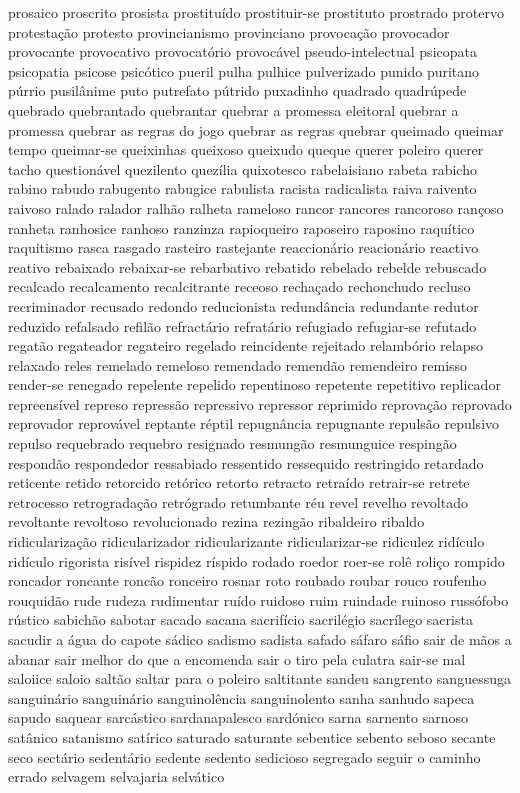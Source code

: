 \documentclass[ruledheader]{abnt_UFF}
\begin{document}
prosaico proscrito prosista prostitu\'{i}do prostituir-se prostituto prostrado protervo protesta\c{c}\~ao protesto provincianismo provinciano provoca\c{c}\~ao provocador provocante provocativo provocat\'{o}rio provoc\'{a}vel pseudo-intelectual psicopata psicopatia psicose psic\'{o}tico pueril pulha pulhice pulverizado punido puritano p\'{u}rrio pusil\^{a}nime puto putrefato p\'{u}trido puxadinho quadrado quadr\'{u}pede quebrado quebrantado quebrantar quebrar a promessa eleitoral quebrar a promessa quebrar as regras do jogo quebrar as regras quebrar queimado queimar tempo queimar-se queixinhas queixoso queixudo queque querer poleiro querer tacho question\'{a}vel quezilento quez\'{i}lia quixotesco rabelaisiano rabeta rabicho rabino rabudo rabugento rabugice rabulista racista radicalista raiva raivento raivoso ralado ralador ralh\~ao ralheta rameloso rancor rancores rancoroso ran\c{c}oso ranheta ranhosice ranhoso ranzinza rapioqueiro raposeiro raposino raqu\'{i}tico raquitismo rasca rasgado rasteiro rastejante reaccion\'{a}rio reacion\'{a}rio reactivo reativo rebaixado rebaixar-se rebarbativo rebatido rebelado rebelde rebuscado recalcado recalcamento recalcitrante receoso recha\c{c}ado rechonchudo recluso recriminador recusado redondo reducionista redund\^{a}ncia redundante redutor reduzido refalsado refil\~ao refract\'{a}rio refrat\'{a}rio refugiado refugiar-se refutado regat\~ao regateador regateiro regelado reincidente rejeitado relamb\'{o}rio relapso relaxado reles remelado remeloso remendado remend\~ao remendeiro remisso render-se renegado repelente repelido repentinoso repetente repetitivo replicador repreens\'{i}vel represo repress\~ao repressivo repressor reprimido reprova\c{c}\~ao reprovado reprovador reprov\'{a}vel reptante r\'{e}ptil repugn\^{a}ncia repugnante repuls\~ao repulsivo repulso requebrado requebro resignado resmung\~ao resmunguice resping\~ao respond\~ao respondedor ressabiado ressentido ressequido restringido retardado reticente retido retorcido ret\'{o}rico retorto retracto retra\'{i}do retrair-se retrete retrocesso retrograda\c{c}\~ao retr\'{o}grado retumbante r\'{e}u revel revelho revoltado revoltante revoltoso revolucionado rezina rezing\~ao ribaldeiro ribaldo ridiculariza\c{c}\~ao ridicularizador ridicularizante ridicularizar-se ridiculez rid\'{i}culo rid\'{i}culo rigorista ris\'{i}vel rispidez r\'{i}spido rodado roedor roer-se rol\^{e} roli\c{c}o rompido roncador roncante ronc\~ao ronceiro rosnar roto roubado roubar rouco roufenho rouquid\~ao rude rudeza rudimentar ru\'{i}do ruidoso ruim ruindade ruinoso russ\'{o}fobo r\'{u}stico sabich\~ao sabotar sacado sacana sacrif\'{i}cio sacril\'{e}gio sacr\'{i}lego sacrista sacudir a \'{a}gua do capote s\'{a}dico sadismo sadista safado s\'{a}faro s\'{a}fio sair de m\~aos a abanar sair melhor do que a encomenda sair o tiro pela culatra sair-se mal saloiice saloio salt\~ao saltar para o poleiro saltitante sandeu sangrento sanguessuga sanguin\'{a}rio sanguin\'{a}rio sanguinol\^{e}ncia sanguinolento sanha sanhudo sapeca sapudo saquear sarc\'{a}stico sardanapalesco sard\'{o}nico sarna sarnento sarnoso sat\^{a}nico satanismo sat\'{i}rico saturado saturante sebentice sebento seboso secante seco sect\'{a}rio sedent\'{a}rio sedente sedento sedicioso segregado seguir o caminho errado selvagem selvajaria selv\'{a}tico 
\end{document}
